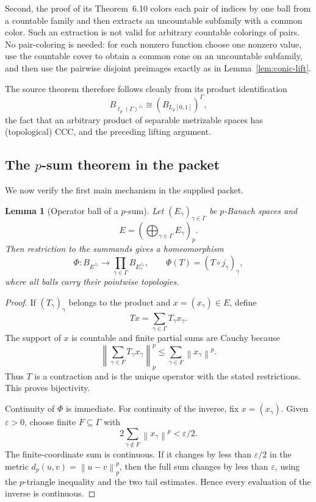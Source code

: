 \documentclass[11pt]{article}
\newtheorem{lemma}[theorem]{Lemma}
\theoremstyle{definition}
\newcommand{\Lp}{L_p[0,1]}
\newcommand{\norm}[1]{\left\lVert #1\right\rVert}
\begin{document}
Second, the proof of its Theorem~6.10 colors each pair of indices by one ball
from a countable family and then extracts an uncountable subfamily with a common
color.  Such an extraction is not valid for arbitrary countable colorings of
pairs.  No pair-coloring is needed: for each nonzero function choose one nonzero
value, use the countable cover to obtain a common cone on an uncountable
subfamily, and then use the pairwise disjoint preimages exactly as in
Lemma~\ref{lem:conic-lift}.

The source theorem therefore follows cleanly from its product identification
\[
 B_{\ell_p(\Gamma)^\triangle}\cong (B_{\Lp})^\Gamma,
\]
the fact that an arbitrary product of separable metrizable spaces has
(topological) CCC, and the preceding lifting argument.

\subsection{The $p$-sum theorem in the packet}

We now verify the first main mechanism in the supplied packet.

\begin{lemma}[Operator ball of a $p$-sum]
\label{lem:psum-product}
Let $(E_\gamma)_{\gamma\in\Gamma}$ be $p$-Banach spaces and
\[
 E=\left(\bigoplus_{\gamma\in\Gamma}E_\gamma\right)_p.
\]
Then restriction to the summands gives a homeomorphism
\[
 \Phi:B_{E^\triangle}\longrightarrow
 \prod_{\gamma\in\Gamma}B_{E_\gamma^\triangle},
 \qquad
 \Phi(T)=(T\circ j_\gamma)_\gamma,
\]
where all balls carry their pointwise topologies.
\end{lemma}

\begin{proof}
If $(T_\gamma)_\gamma$ belongs to the product and $x=(x_\gamma)\in E$, define
\[
 Tx=\sum_{\gamma\in\Gamma}T_\gamma x_\gamma.
\]
The support of $x$ is countable and finite partial sums are Cauchy because
\[
 \norm{\sum_{\gamma\in F}T_\gamma x_\gamma}_p^p
 \leq\sum_{\gamma\in F}\norm{x_\gamma}^p.
\]
Thus $T$ is a contraction and is the unique operator with the stated
restrictions.  This proves bijectivity.

Continuity of $\Phi$ is immediate.  For continuity of the inverse, fix
$x=(x_\gamma)$.  Given $\varepsilon>0$, choose finite $F\subseteq\Gamma$ with
\[
 2\sum_{\gamma\notin F}\norm{x_\gamma}^p<\varepsilon/2.
\]
The finite-coordinate sum is continuous.  If it changes by less than
$\varepsilon/2$ in the metric $d_p(u,v)=\norm{u-v}_p^p$, then the full sum changes
by less than $\varepsilon$, using the $p$-triangle inequality and the two tail
estimates.  Hence every evaluation of the inverse is continuous.
\end{proof}
\end{document}
